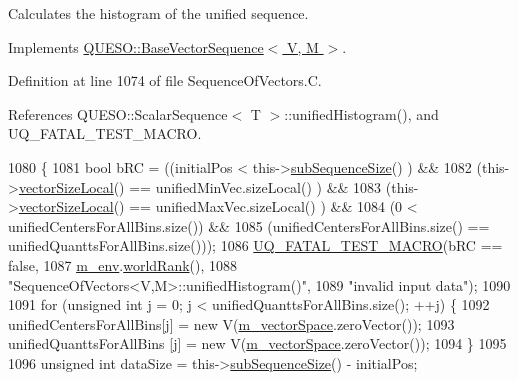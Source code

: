 Calculates the histogram of the unified sequence. 



Implements \hyperlink{class_q_u_e_s_o_1_1_base_vector_sequence_a04653bd3bd8b9c29ae6d03a2eb0b3779}{Q\-U\-E\-S\-O\-::\-Base\-Vector\-Sequence$<$ V, M $>$}.



Definition at line 1074 of file Sequence\-Of\-Vectors.\-C.



References Q\-U\-E\-S\-O\-::\-Scalar\-Sequence$<$ T $>$\-::unified\-Histogram(), and U\-Q\-\_\-\-F\-A\-T\-A\-L\-\_\-\-T\-E\-S\-T\-\_\-\-M\-A\-C\-R\-O.


\begin{DoxyCode}
1080 \{
1081   \textcolor{keywordtype}{bool} bRC = ((initialPos                      <  this->\hyperlink{class_q_u_e_s_o_1_1_sequence_of_vectors_a0224bd3e961d86af5d2886301c0c2b86}{subSequenceSize}()        ) &&
1082               (this->\hyperlink{class_q_u_e_s_o_1_1_base_vector_sequence_a2fefedf9e5b90f22881103b3f92555f6}{vectorSizeLocal}()         == unifiedMinVec.sizeLocal()      ) &&
1083               (this->\hyperlink{class_q_u_e_s_o_1_1_base_vector_sequence_a2fefedf9e5b90f22881103b3f92555f6}{vectorSizeLocal}()         == unifiedMaxVec.sizeLocal()      ) &&
1084               (0                               <  unifiedCentersForAllBins.size()) &&
1085               (unifiedCentersForAllBins.size() == unifiedQuanttsForAllBins.size()));
1086   \hyperlink{_defines_8h_a56d63d18d0a6d45757de47fcc06f574d}{UQ\_FATAL\_TEST\_MACRO}(bRC == \textcolor{keyword}{false},
1087                       \hyperlink{class_q_u_e_s_o_1_1_base_vector_sequence_a8e8824d2a63c5a43bcc6473e3a0491e8}{m\_env}.\hyperlink{class_q_u_e_s_o_1_1_base_environment_a78b57112bbd0e6dd0e8afec00b40ffa7}{worldRank}(),
1088                       \textcolor{stringliteral}{"SequenceOfVectors<V,M>::unifiedHistogram()"},
1089                       \textcolor{stringliteral}{"invalid input data"});
1090 
1091   \textcolor{keywordflow}{for} (\textcolor{keywordtype}{unsigned} \textcolor{keywordtype}{int} j = 0; j < unifiedQuanttsForAllBins.size(); ++j) \{
1092     unifiedCentersForAllBins[j] = \textcolor{keyword}{new} V(\hyperlink{class_q_u_e_s_o_1_1_base_vector_sequence_a4bd171e39ed050ff105c808336f35198}{m\_vectorSpace}.zeroVector());
1093     unifiedQuanttsForAllBins [j] = \textcolor{keyword}{new} V(\hyperlink{class_q_u_e_s_o_1_1_base_vector_sequence_a4bd171e39ed050ff105c808336f35198}{m\_vectorSpace}.zeroVector());
1094   \}
1095 
1096   \textcolor{keywordtype}{unsigned} \textcolor{keywordtype}{int} dataSize = this->\hyperlink{class_q_u_e_s_o_1_1_sequence_of_vectors_a0224bd3e961d86af5d2886301c0c2b86}{subSequenceSize}() - initialPos;

\end{DoxyCode}
